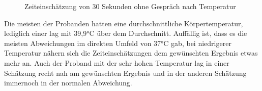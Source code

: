 \documentclass{Paper}
\begin{document}
\begin{figure}[H]
\begin{minipage}[t]{0.49\linewidth}
\caption{Zeiteinschätzung von 30 Sekunden ohne Gespräch nach Temperatur}
\label{Zeit30sekTemp}
\end{minipage}
\end{figure}

Die meisten der Probanden hatten eine durchschnittliche Körpertemperatur, lediglich einer lag mit 39,9°C über dem Durchschnitt. Auffällig ist, dass es die meisten Abweichungen im direkten Umfeld von 37°C gab, bei niedrigerer Temperatur nähern sich die Zeiteinschätzungen dem gewünschten Ergebnis etwas mehr an. Auch der Proband mit der sehr hohen Temperatur lag in einer Schätzung recht nah am gewünschten Ergebnis und in der anderen Schätzung immernoch in der normalen Abweichung.
\end{document}
